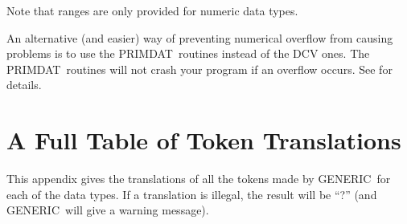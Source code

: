 \documentclass[twoside,11pt,nolof]{starlink}
\providecommand{\GENERIC}{{\footnotesize GENERIC}\normalsize}
\providecommand{\PRIMDAT}{{\footnotesize PRIMDAT}\normalsize}
\begin{document}
Note that ranges are only provided for numeric data types.

An alternative (and easier) way of preventing numerical overflow from
causing problems is to use the \PRIMDAT\ routines instead of the
DCV ones.  The \PRIMDAT\ routines will not crash your program if an
overflow occurs.  See  for details.

\appendix
\newpage
\section{A Full Table of Token Translations\label{ap_a}}

This appendix gives the translations of all the tokens
made by \GENERIC\ for each of the data types.
If a translation is illegal, the result will be ``?''
(and \GENERIC\ will give a warning message).
\end{document}
